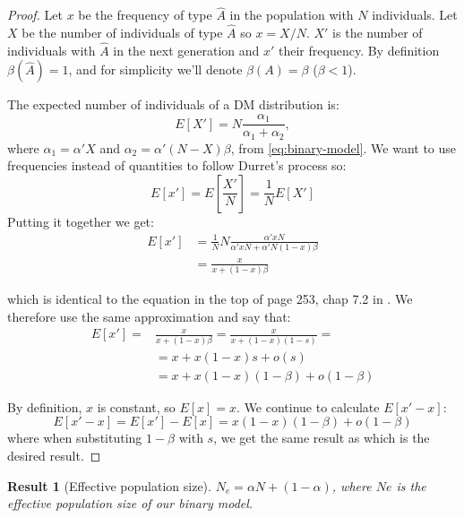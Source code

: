 \documentclass[12pt]{extarticle}
\newtheorem{result}{Result}
\begin{document}
\begin{proof}
Let $x$ be the frequency of type $\hat{A}$ in the population with $N$ individuals. Let $X$ be the number of individuals of type $\hat{A}$ so $x=X/N$. $X'$ is the number of individuals with $\hat{A}$ in the next generation and $x'$ their frequency.
By definition $\beta(\hat{A})=1$, and for simplicity we'll denote $\beta(A)=\beta$ ($\beta<1$).

The expected number of individuals of a DM distribution is:
\begin{equation}
E[X'] = N  \frac{\alpha_1}{\alpha_1+\alpha_2},
\end{equation}
where $\alpha_1 = \alpha' X$ and $\alpha_2 = \alpha'(N-X)\beta$, from  \cref{eq:binary-model}.
We want to use frequencies instead of quantities to follow Durret's process so:
\begin{equation}
E[x'] = E[\frac{X'}{N}] = \frac{1}{N}E[X']
\end{equation}
Putting it together we get:
\begin{equation}
\begin{split}
E[x'] &= \frac{1}{N}N\frac{\alpha' xN}{\alpha' xN + \alpha' N (1-x)\beta}\\
	 &= \frac{x}{x + (1-x)\beta}
\end{split}
\end{equation}

which is identical to the equation in the top of page 253, chap 7.2 in \citet{durret}. We therefore use the same approximation and say that:
\begin{equation}
\begin{split}
E[x'] =& \frac{x}{x + (1-x)\beta} = \frac{x}{x + (1-x)(1-s)} =\\
 &= x + x(1-x)s + o(s)\\
  &= x + x(1-x)(1-\beta) + o(1-\beta)
\end{split}
\end{equation}

By definition, $x$ is constant, so $E[x] = x$. We continue to calculate $E[x'-x]$:
\begin{equation}\label{eq:expec_freq}
E[x'-x] = E[x'] - E[x] = x(1-x)(1-\beta) + o(1-\beta)
\end{equation}
where when substituting $1-\beta$ with $s$, we get the same result as \citet{durret} which is the desired result.
\end{proof}

\begin{result}[Effective population size]\label{res:effective_population}
$N_e=\alpha N + (1-\alpha)$, where $Ne$ is the effective population size of our binary model.
\end{result}
\end{document}
